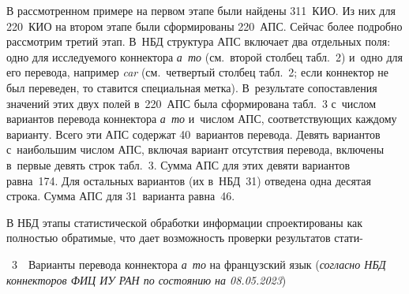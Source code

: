 \begin{multicols}{2}
  В рассмотренном примере на первом этапе были найдены 311~КИО. Из них для 
220~КИО на втором этапе были сформированы 220~АПС. Сейчас более по\-дроб\-но 
рас\-смот\-рим третий этап. В~НБД структура АПС включает два отдельных поля: 
одно для ис\-сле\-ду\-емо\-го коннектора \textit{а~то} (см.\ второй стол\-бец табл.~2) 
и~одно для его перевода, например \textit{car} (см.\ четвертый столбец табл.~2; если 
коннектор не был переведен, то ставится специальная мет\-ка). В~результате 
со\-по\-став\-ле\-ния значений этих двух полей в~220~АПС была сформирована табл.~3 
с~чис\-лом вариантов перевода коннектора \textit{а~то} и~чис\-лом АПС, 
со\-от\-вет\-ст\-ву\-ющих каж\-до\-му варианту. Всего эти АПС содержат 40~вариантов 
перевода. Девять вариантов с~наибольшим чис\-лом АПС, включая вариант 
отсутствия перевода, включены в~первые девять строк табл.~3. Сумма АПС для 
этих девяти вариантов рав\-на~174. Для остальных вариантов (их в~НБД~31) 
отведена одна десятая строка. Сумма АПС для 31~варианта рав\-на~46.



  
  В НБД этапы статистической обработки информации спроектированы как 
пол\-ностью обратимые, что дает воз\-мож\-ность проверки результатов 
ста\-ти-\linebreak\vspace*{-12pt}

\vspace*{12pt}

   \begin{center}
   \noindent
\parbox{228pt}{{{\tablename~3}\ \ \small{Варианты перевода коннектора \textit{а~то} на французский язык 
(\textit{согласно НБД коннекторов ФИЦ ИУ РАН по состоянию на 08.05.2023})
}}
}
   \vspace*{2ex}
   

\end{center}
\end{multicols}
